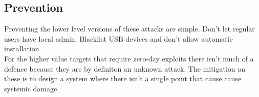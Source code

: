 \subsection{Prevention}
Preventing the lower level versions of these attacks are simple. Don't let regular users have local admin. Blacklist USB devices and don't allow automatic installation.\\
For the higher value targets that require zero-day exploits there isn't much of a defence because they are by definiton an unknown attack. The mitigation on these is to design a system where there isn't a single point that cause cause systemic damage.  
